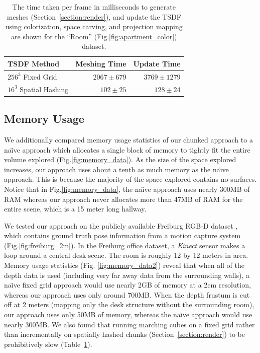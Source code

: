 \documentclass[conference]{IEEEtran}
\newcommand{\sref}[1]{Section~\ref{#1}}
\newcommand{\figref}[1]{Fig.\ref{#1}}
\newcommand{\tabref}[1]{Table~\ref{#1}}
\newcommand{\naive}{na\"{\i}ve }
\begin{document}
\begin{table}
\footnotesize
\hfill
\centering
\begin{tabular} {| l | r | r |}
\hline
TSDF Method & Meshing Time & Update Time\\ \hline
$256^3$ Fixed Grid                      & $2067 \pm 679$ & $3769 \pm 1279 $  \\
\hline $16^3$ Spatial Hashing & $102 \pm 25$ &  $128 \pm 24$\\ \hline
\end{tabular}
\caption{The time taken per frame in milliseconds to generate meshes
(\sref{section:render}), and update the TSDF using colorization, space carving, and projection mapping
are shown for the ``Room'' (\figref{fig:apartment_color}) dataset.}
\label{table:meshingtimes}
\end{table}

\subsection{Memory Usage}
\label{section:memory}
We additionally compared memory usage statistics of our chunked approach to a
\naive approach which allocates a single block of memory to tightly fit the
entire volume explored (\figref{fig:memory_data}). As the size of the space
explored increases, our approach uses about a tenth as much memory as the
\naive approach. This is because the majority of the space explored contains no
surfaces. Notice that in \figref{fig:memory_data}, the \naive approach uses
nearly 300MB of RAM whereas our approach never allocates more than 47MB of RAM
for the entire scene, which is a 15 meter long hallway.

We tested our approach on the publicly available Freiburg RGB-D dataset
\cite{FREIBURG}, which contains ground truth pose information from a motion
capture system (\figref{fig:freiburg_2m}). In the Freiburg office dataset, a
\textit{Kinect} sensor makes a loop around a central desk scene. The room is
roughly 12 by 12 meters in area.  Memory usage statistics (Fig.
\ref{fig:memory_data2}) reveal that when all of the depth data is used
(including very far away data from the surrounding walls), a \naive fixed grid
approach would use nearly 2GB of memory at a 2cm resolution, whereas our
approach uses only around 700MB. When the depth frustum is cut off at 2 meters
(mapping only the desk structure without the surrounding room), our approach
uses only 50MB of memory, whereas the \naive approach would use nearly 300MB. We
also found that running marching cubes on a fixed grid rather than
incrementally on spatially hashed chunks (\sref{section:render}) to be
prohibitively slow (\tabref{table:meshingtimes}).
\end{document}
